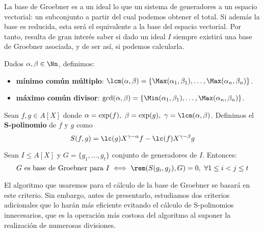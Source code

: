 La base de Groebner es a un ideal lo que un sistema de generadores a un espacio vectorial: un subconjunto a partir del cual podemos obtener el total. Si además la base es reducida, esta será el equivalente a la base del espacio vectorial. Por tanto, resulta de gran interés saber si dado un ideal $I$ siempre existirá una base de Groebner asociada, y de ser así, si podemos calcularla.

\begin{definicion}
    Dados $\alpha,\beta \in \Nn$, definimos:
    \begin{itemize}
        \item \textbf{mínimo común múltiplo}: $\lcm(\alpha,\beta) = \{\Max(\alpha_1, \beta_1),\dots, \Max(\alpha_n, \beta_n)\}$.
        \item \textbf{máximo común divisor}: $\gcd(\alpha,\beta) = \{\Min(\alpha_1, \beta_1),\dots, \Max(\alpha_n, \beta_n)\}$.
    \end{itemize}
\end{definicion}

\begin{definicion}
    Sean $f,g \in A[X]$ donde $\alpha=\exp(f),\ \beta=\exp(g),\ \gamma = \lcm(\alpha,\beta)$. Definimos el \textbf{S-polinomio} de $f$ y $g$ como
    \begin{equation*}
        S(f,g) = \lc(g)X^{\gamma-\alpha}f - \lc(f)X^{\gamma-\beta}g
    \end{equation*}
\end{definicion}

\begin{teorema}\label{t:criterio}
    Sean $I\le A[X]$ y $G=\{g_1,\dots, g_t\}$ conjunto de generadores de $I$. Entonces:
    \begin{equation*}
        G \text{ es base de Groebner para } I \iff \rem(S(g_i,g_j), G)=0,\ \forall 1\le i<j\le t
    \end{equation*}
\end{teorema}

El algoritmo que usaremos para el cálculo de la base de Groebner se basará en este criterio. Sin embargo, antes de presentarlo, estudiamos dos criterios adicionales que lo harán más eficiente evitando el cálculo de S-polinomios innecesarios, que es la operación más costosa del algoritmo al suponer la realización de numerosas divisiones.

